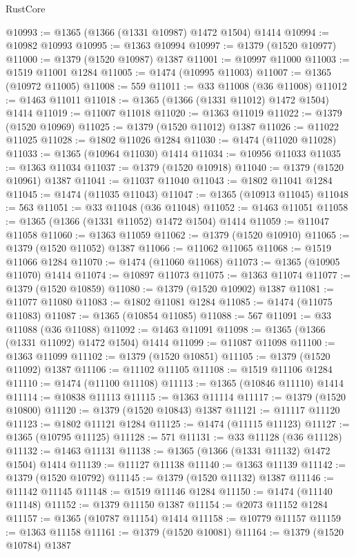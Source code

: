 \begin{lexlean}{RustCore}
\begin{coremodule}
@10993 := @1365 (@1366 (@1331 @10987) @1472 @1504) @1414
@10994 := @10982 @10993
@10995 := @1363 @10994
@10997 := @1379 (@1520 @10977)
@11000 := @1379 (@1520 @10987) @1387
@11001 := @10997 @11000
@11003 := @1519 @11001 @1284
@11005 := @1474 (@10995 @11003)
@11007 := @1365 (@10972 @11005)
@11008 := 559
@11011 := @33 @11008 (@36 @11008)
@11012 := @1463 @11011
@11018 := @1365 (@1366 (@1331 @11012) @1472 @1504) @1414
@11019 := @11007 @11018
@11020 := @1363 @11019
@11022 := @1379 (@1520 @10969)
@11025 := @1379 (@1520 @11012) @1387
@11026 := @11022 @11025
@11028 := @1802 @11026 @1284
@11030 := @1474 (@11020 @11028)
@11033 := @1365 (@10964 @11030) @1414
@11034 := @10956 @11033
@11035 := @1363 @11034
@11037 := @1379 (@1520 @10918)
@11040 := @1379 (@1520 @10961) @1387
@11041 := @11037 @11040
@11043 := @1802 @11041 @1284
@11045 := @1474 (@11035 @11043)
@11047 := @1365 (@10913 @11045)
@11048 := 563
@11051 := @33 @11048 (@36 @11048)
@11052 := @1463 @11051
@11058 := @1365 (@1366 (@1331 @11052) @1472 @1504) @1414
@11059 := @11047 @11058
@11060 := @1363 @11059
@11062 := @1379 (@1520 @10910)
@11065 := @1379 (@1520 @11052) @1387
@11066 := @11062 @11065
@11068 := @1519 @11066 @1284
@11070 := @1474 (@11060 @11068)
@11073 := @1365 (@10905 @11070) @1414
@11074 := @10897 @11073
@11075 := @1363 @11074
@11077 := @1379 (@1520 @10859)
@11080 := @1379 (@1520 @10902) @1387
@11081 := @11077 @11080
@11083 := @1802 @11081 @1284
@11085 := @1474 (@11075 @11083)
@11087 := @1365 (@10854 @11085)
@11088 := 567
@11091 := @33 @11088 (@36 @11088)
@11092 := @1463 @11091
@11098 := @1365 (@1366 (@1331 @11092) @1472 @1504) @1414
@11099 := @11087 @11098
@11100 := @1363 @11099
@11102 := @1379 (@1520 @10851)
@11105 := @1379 (@1520 @11092) @1387
@11106 := @11102 @11105
@11108 := @1519 @11106 @1284
@11110 := @1474 (@11100 @11108)
@11113 := @1365 (@10846 @11110) @1414
@11114 := @10838 @11113
@11115 := @1363 @11114
@11117 := @1379 (@1520 @10800)
@11120 := @1379 (@1520 @10843) @1387
@11121 := @11117 @11120
@11123 := @1802 @11121 @1284
@11125 := @1474 (@11115 @11123)
@11127 := @1365 (@10795 @11125)
@11128 := 571
@11131 := @33 @11128 (@36 @11128)
@11132 := @1463 @11131
@11138 := @1365 (@1366 (@1331 @11132) @1472 @1504) @1414
@11139 := @11127 @11138
@11140 := @1363 @11139
@11142 := @1379 (@1520 @10792)
@11145 := @1379 (@1520 @11132) @1387
@11146 := @11142 @11145
@11148 := @1519 @11146 @1284
@11150 := @1474 (@11140 @11148)
@11152 := @1379 @11150 @1387
@11154 := @2073 @11152 @1284
@11157 := @1365 (@10787 @11154) @1414
@11158 := @10779 @11157
@11159 := @1363 @11158
@11161 := @1379 (@1520 @10081)
@11164 := @1379 (@1520 @10784) @1387

\end{coremodule}
\end{lexlean}
